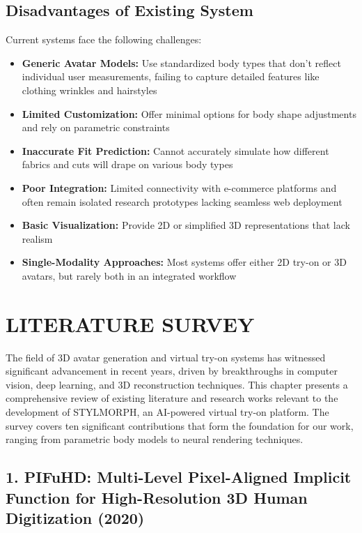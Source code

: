 \documentclass[12pt,a4paper,oneside]{report}
\begin{document}
\section{Disadvantages of Existing System}

Current systems face the following challenges:
\begin{itemize}
    \item \textbf{Generic Avatar Models:} Use standardized body types that don't reflect individual user measurements, failing to capture detailed features like clothing wrinkles and hairstyles \cite{2, 10}
    \item \textbf{Limited Customization:} Offer minimal options for body shape adjustments and rely on parametric constraints \cite{9, 11}
    \item \textbf{Inaccurate Fit Prediction:} Cannot accurately simulate how different fabrics and cuts will drape on various body types \cite{15}
    \item \textbf{Poor Integration:} Limited connectivity with e-commerce platforms and often remain isolated research prototypes lacking seamless web deployment \cite{7}
    \item \textbf{Basic Visualization:} Provide 2D or simplified 3D representations that lack realism \cite{17}
    \item \textbf{Single-Modality Approaches:} Most systems offer either 2D try-on or 3D avatars, but rarely both in an integrated workflow \cite{3, 12}
\end{itemize}

\chapter{LITERATURE SURVEY}

The field of 3D avatar generation and virtual try-on systems has witnessed significant advancement in recent years, driven by breakthroughs in computer vision, deep learning, and 3D reconstruction techniques. This chapter presents a comprehensive review of existing literature and research works relevant to the development of STYLMORPH, an AI-powered virtual try-on platform. The survey covers ten significant contributions that form the foundation for our work, ranging from parametric body models to neural rendering techniques.

\section*{1. PIFuHD: Multi-Level Pixel-Aligned Implicit Function for High-Resolution 3D Human Digitization (2020)}
\end{document}
